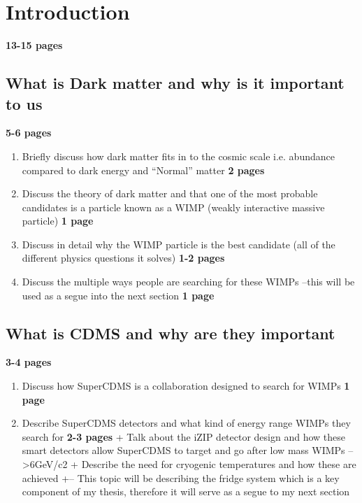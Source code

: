 \section{Introduction}

\textbf{13-15 pages}

\subsection{What is Dark matter and why is it important to us} \label{sec:darkmatter} \textbf{5-6 pages}


\begin{enumerate}
    \item Briefly discuss how dark matter fits in to the cosmic scale i.e. abundance compared to dark energy and “Normal” matter \textbf{2 pages}
    \item Discuss the theory of dark matter and that one of the most probable candidates is a particle known as a WIMP (weakly interactive massive particle) \textbf{1 page}
    \item Discuss in detail why the WIMP particle is the best candidate (all of the different physics questions it solves) \textbf{1-2 pages}
    \item Discuss the multiple ways people are searching for these WIMPs –this will be used as a segue into the next section \textbf{1 page}
\end{enumerate}

\subsection{What is CDMS and why are they important} \textbf{3-4 pages}

\begin{enumerate}
    \item Discuss how SuperCDMS is a collaboration designed to search for WIMPs \textbf{1 page}
    \item Describe SuperCDMS detectors and what kind of energy range WIMPs they search for \textbf{2-3 pages}
        + Talk about the iZIP detector design and how these smart detectors allow SuperCDMS to target and go after low mass WIMPs –   >6GeV/c2
        + Describe the need for cryogenic temperatures and how these are achieved
        +--	This topic will be describing the fridge system which is a key component of my thesis, therefore it will serve as a segue to my next section
\end{enumerate}

